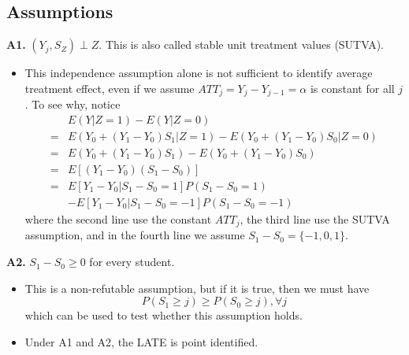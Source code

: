 \documentclass[a4paper,11pt]{article}
\begin{document}
\subsection{Assumptions}
\textbf{A1.} $(Y_j,S_Z)\perp Z$. This is also called stable unit treatment values (SUTVA). 
\begin{itemize}
\item 
This independence assumption alone is not sufficient to identify average treatment effect, even if we assume $ATT_j=Y_j-Y_{j-1} =\alpha$ is constant for all $j$. To see why, notice
\[\begin{aligned}
&E(Y|Z=1)-E(Y|Z=0) \\
=&E(Y_0+(Y_1-Y_0)S_1|Z=1)-E(Y_0+(Y_1-Y_0)S_0|Z=0) \\
=&E(Y_0+(Y_1-Y_0)S_1)-E(Y_0+(Y_1-Y_0)S_0) \\
=&E[(Y_1-Y_0)(S_1-S_0)] \\
=&E[Y_1-Y_0|S_1-S_0=1]P(S_1-S_0=1) \\
&-E[Y_1-Y_0|S_1-S_0=-1]P(S_1-S_0=-1)
\end{aligned}\]
where the second line use the constant $ATT_j$, the third line use the SUTVA assumption, and in the fourth line we assume $S_1-S_0=\{-1,0,1\}$.
\end{itemize}
\textbf{A2.} $S_1-S_0 \geq 0$ for every student.
\begin{itemize}
\item 
This is a non-refutable assumption, but if it is true, then we must have 
\[P(S_1\geq j) \geq P(S_0\geq j), \forall j\]
which can be used to test whether this assumption holds.
\item 
Under A1 and A2, the LATE is point identified.
\end{itemize}
\end{document}
